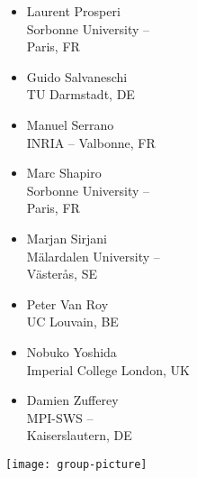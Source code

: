 \documentclass[a4paper,UKenglish]{dagrep-v2018}
\begin{document}
\begin{multicols}{3}
\begin{itemize}
  \item Laurent Prosperi\\Sorbonne University -- \\Paris, FR
  \item Guido Salvaneschi\\TU Darmstadt, DE
  \item Manuel Serrano\\INRIA -- Valbonne, FR
  \item Marc Shapiro\\Sorbonne University -- \\Paris, FR
  \item Marjan Sirjani\\M{\"a}lardalen University -- \\V{\"a}ster{\aa}s, SE
  \item Peter Van Roy\\UC Louvain, BE
  \item Nobuko Yoshida\\Imperial College London, UK
  \item Damien Zufferey\\MPI-SWS -- \\Kaiserslautern, DE
  \end{itemize}
\end{multicols}

\bigskip

\texttt{[image: group-picture]}
\end{document}
